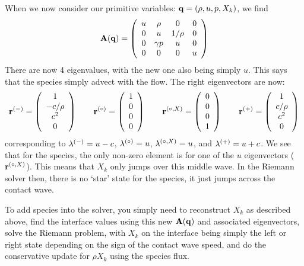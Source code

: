 When we now consider our primitive variables: ${\bf q} = (\rho, u, p, X_k)$,
we find
\begin{equation}
{\bf A}({\bf q}) = \left ( \begin{array}{cccc} u  & \rho     & 0      &  0\\
                                  0  &  u       & 1/\rho &  0\\
                                  0  & \gamma p & u      &  0\\
                                  0  & 0        & 0      & u \end{array} \right )
\end{equation}
There are now 4 eigenvalues, with the new one also being simply $u$.
This says that the species simply advect with the flow.  The right
eigenvectors are now:
\begin{equation}
\rb^\evm = \left ( \begin{array}{c} 1 \\ -c/\rho \\ c^2 \\ 0\end{array} \right )
%
\qquad
\rb^\evz = \left ( \begin{array}{c} 1 \\ 0 \\ 0  \\ 0\end{array} \right )
%
\qquad
\rb^\evzs{X} = \left ( \begin{array}{c} 0 \\ 0  \\ 0 \\ 1 \end{array} \right )
%
\qquad
\rb^\evp = \left ( \begin{array}{c} 1 \\ c/\rho \\ c^2 \\ 0 \end{array} \right )
\end{equation}
corresponding to $\lambda^{(-)} = u -c$, $\lambda^{(\circ)} = u$,
$\lambda^{(\circ,X)} = u$, and $\lambda^{(+)} = u + c$.  We see that for
the species, the only non-zero element is for one of the $u$
eigenvectors (${\bf r}^{(\circ,X)}$).  This means that $X_k$ only jumps over
this middle wave.  In the Riemann solver then, there is no `star'
state for the species, it just jumps across the contact wave.

To add species into the solver, you simply need to reconstruct $X_k$
as described above, find the interface values using this new ${\bf A}({\bf q})$
and associated eigenvectors, solve the Riemann problem, with $X_k$ on
the interface being simply the left or right state depending on the
sign of the contact wave speed, and do the conservative update for
$\rho X_k$ using the species flux.



